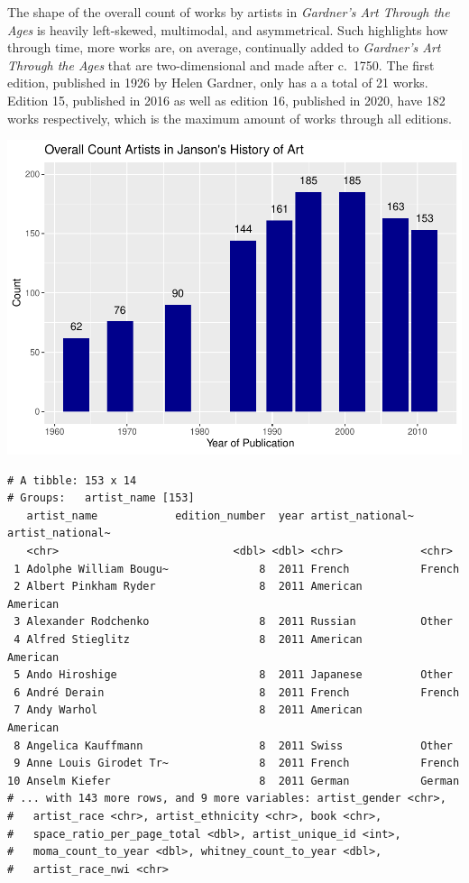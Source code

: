 \documentclass[
  letterpaper,
  DIV=11,
  numbers=noendperiod]{scrreprt}
\begin{document}
The shape of the overall count of works by artists in \emph{Gardner's
Art Through the Ages} is heavily left-skewed, multimodal, and
asymmetrical. Such highlights how through time, more works are, on
average, continually added to \emph{Gardner's Art Through the Ages} that
are two-dimensional and made after c.~1750. The first edition, published
in 1926 by Helen Gardner, only has a a total of 21 works. Edition 15,
published in 2016 as well as edition 16, published in 2020, have 182
works respectively, which is the maximum amount of works through all
editions.

\includegraphics{Chapter1/Chapter1_files/figure-pdf/jansoncountthroughtime-1.pdf}

\begin{verbatim}
# A tibble: 153 x 14
# Groups:   artist_name [153]
   artist_name            edition_number  year artist_national~ artist_national~
   <chr>                           <dbl> <dbl> <chr>            <chr>           
 1 Adolphe William Bougu~              8  2011 French           French          
 2 Albert Pinkham Ryder                8  2011 American         American        
 3 Alexander Rodchenko                 8  2011 Russian          Other           
 4 Alfred Stieglitz                    8  2011 American         American        
 5 Ando Hiroshige                      8  2011 Japanese         Other           
 6 André Derain                        8  2011 French           French          
 7 Andy Warhol                         8  2011 American         American        
 8 Angelica Kauffmann                  8  2011 Swiss            Other           
 9 Anne Louis Girodet Tr~              8  2011 French           French          
10 Anselm Kiefer                       8  2011 German           German          
# ... with 143 more rows, and 9 more variables: artist_gender <chr>,
#   artist_race <chr>, artist_ethnicity <chr>, book <chr>,
#   space_ratio_per_page_total <dbl>, artist_unique_id <int>,
#   moma_count_to_year <dbl>, whitney_count_to_year <dbl>,
#   artist_race_nwi <chr>
\end{verbatim}
\end{document}
